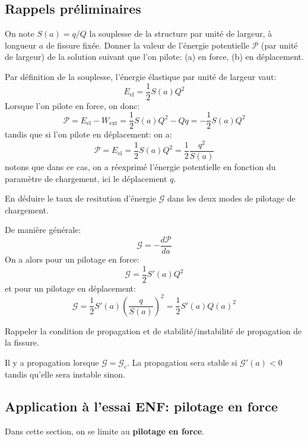 \subsection{Rappels préliminaires}
\begin{questions}

\question On note $S(a)=q/Q$ la souplesse de la structure par unité de largeur, à longueur $a$ de fissure fixée. Donner la valeur de l'énergie potentielle $\mathcal{P}$ (par unité de largeur) de la solution suivant que l'on pilote: (a) en force, (b) en déplacement.
\begin{solution}
Par définition de la souplesse, l'énergie élastique par unité de largeur vaut:
$$E_\text{el}=\dfrac{1}{2}S(a)Q^2$$
Lorsque l'on pilote en force, on donc:
$$\mathcal{P} = E_\text{el}-W_\text{ext} = \dfrac{1}{2}S(a)Q^2 - Qq = -\dfrac{1}{2}S(a)Q^2$$
tandis que si l'on pilote en déplacement:
on a:
$$\mathcal{P} = E_\text{el} = \dfrac{1}{2}S(a)Q^2 = \dfrac{1}{2}\dfrac{q^2}{S(a)}$$
notons que dans ce cas, on a réexprimé l'énergie potentielle en fonction du paramètre de chargement, ici le déplacement $q$.
\end{solution}
\question En déduire le taux de resitution d'énergie $\mathcal{G}$ dans les deux modes de pilotage de chargement.
\begin{solution}
De manière générale:
$$\mathcal{G} = -\dfrac{d\mathcal{P}}{da} $$
On a alors pour un pilotage en force:
$$\mathcal{G} =  \dfrac{1}{2}S'(a)Q^2$$
et pour un pilotage en déplacement:
$$\mathcal{G} =  \dfrac{1}{2}S'(a)\left(\dfrac{q}{S(a)}\right)^2=\dfrac{1}{2}S'(a)Q(a)^2$$
\end{solution}
\question Rappeler la condition de propagation et de stabilité/instabilité de propagation de la fissure.
\begin{solution}
Il y a propagation lorsque $\mathcal{G}=\mathcal{G}_c$. La propagation sera stable si $\mathcal{G}'(a) < 0$ tandis qu'elle sera instable sinon.
\end{solution}
\end{questions}

\subsection{Application à l'essai ENF: pilotage en force}
Dans cette section, on se limite au \textbf{pilotage en force}.

